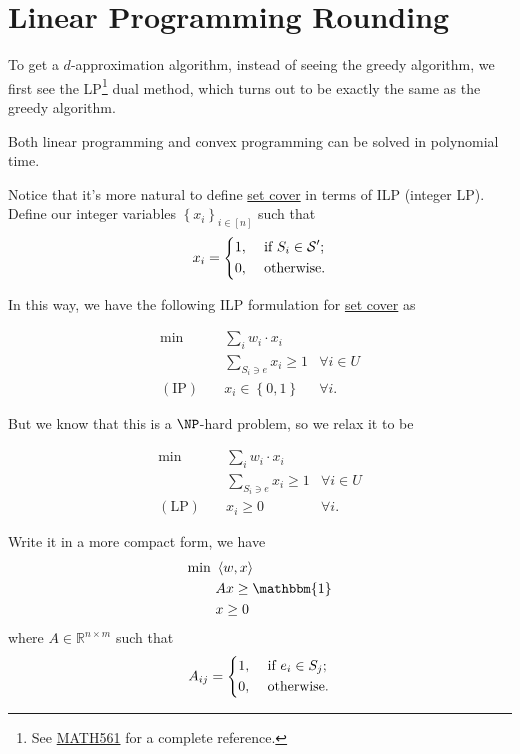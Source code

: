 \section{Linear Programming Rounding}
To get a \(d\)-approximation algorithm, instead of seeing the greedy algorithm, we first see the LP\footnote{See \href{https://pbb.wtf/posts/Notes\#linear-programming-math561ioe510to518-umich}{MATH561} for a complete reference.} dual method, which turns out to be exactly the same as the greedy algorithm.

\begin{prev}
	Both linear programming and convex programming can be solved in polynomial time.
\end{prev}

Notice that it's more natural to define \hyperref[prb:set-cover]{set cover} in terms of ILP (integer LP). Define our integer variables \(\left\{ x_i \right\} _{i\in [n]}\) such that
\[
	x_i = \begin{dcases}
		1, & \text{ if } S_i\in \mathcal{S} ^\prime  ; \\
		0, & \text{ otherwise}.
	\end{dcases}
\]

In this way, we have the following ILP formulation for \hyperref[prb:set-cover]{set cover} as

\[
	\begin{aligned}
		\min~            & \sum_{i} w_i \cdot x_i                           \\
		                 & \sum_{S_i\ni e}x_{i} \geq 1     & \forall i\in U \\
		(\text{IP})\quad & x_{i} \in \left\{ 0, 1 \right\} & \forall i.
	\end{aligned}
\]

But we know that this is a \(\NP\)-hard problem, so we relax it to be

\[
	\begin{aligned}
		\min~            & \sum_{i} w_i \cdot x_i                       \\
		                 & \sum_{S_i\ni e}x_{i} \geq 1 & \forall i\in U \\
		(\text{LP})\quad & x_{i} \geq 0                & \forall i.
	\end{aligned}
\]

Write it in a more compact form, we have
\[
	\begin{aligned}
		\min~ & \left\langle w, x \right\rangle \\
		      & Ax \geq \mathbbm{1}             \\
		      & x\geq 0
	\end{aligned}
\]
where \(A\in \mathbb{R} ^{n\times m}\) such that
\[
	A_{ij} = \begin{dcases}
		1, & \text{ if } e_i\in S_j ; \\
		0, & \text{ otherwise}.
	\end{dcases}
\]

